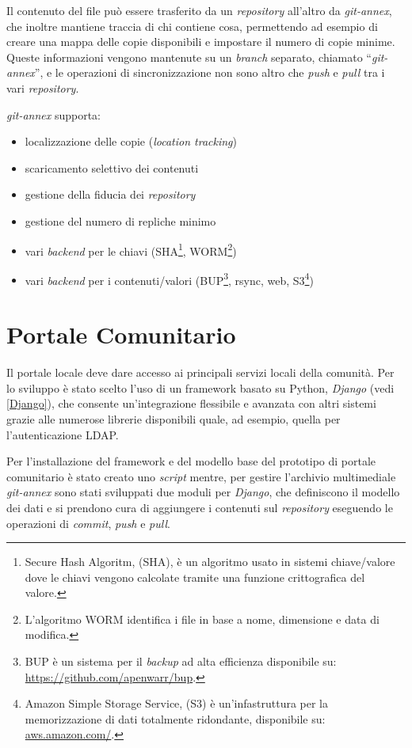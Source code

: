 Il contenuto del file può essere trasferito da un \emph{repository}
all'altro da \emph{git-annex}, che inoltre mantiene traccia di chi
contiene cosa, permettendo ad esempio di creare una mappa delle copie
disponibili e impostare il numero di copie minime. Queste informazioni
vengono mantenute su un \emph{branch} separato, chiamato
``\emph{git-annex}'', e le operazioni di sincronizzazione non sono
altro che \emph{push} e \emph{pull} tra i vari \emph{repository}.

\emph{git-annex} supporta:
\begin{itemize}
\item localizzazione delle copie (\emph{location tracking})
\item scaricamento selettivo dei contenuti
\item gestione della fiducia dei \emph{repository}
\item gestione del numero di repliche minimo 
\item vari \emph{backend} per le chiavi (SHA\footnote{Secure Hash
    Algoritm, (SHA), è un algoritmo usato in sistemi chiave/valore
    dove le chiavi vengono calcolate tramite una funzione
    crittografica del valore.}, WORM\footnote{L'algoritmo WORM
    identifica i file in base a nome, dimensione e data di modifica.})
\item vari \emph{backend} per i contenuti/valori (BUP\footnote{BUP è
    un sistema per il \emph{backup} ad alta efficienza disponibile su:
    \url{https://github.com/apenwarr/bup}.}, rsync, web,
  S3\footnote{Amazon Simple Storage Service, (S3) è un'infastruttura
    per la memorizzazione di dati totalmente ridondante, disponibile
    su: \url{aws.amazon.com/}.})
\end{itemize}

\section{Portale Comunitario}
Il portale locale deve dare accesso ai principali servizi locali della
comunità. Per lo sviluppo è stato scelto l'uso di un framework basato
su Python, \emph{Django} (vedi \ref{Django}), che consente
un'integrazione flessibile e avanzata con altri sistemi grazie alle
numerose librerie disponibili quale, ad esempio, quella per
l'autenticazione LDAP.

Per l'installazione del framework e del modello base del prototipo di
portale comunitario è stato creato uno \emph{script} mentre, per
gestire l'archivio multimediale \emph{git-annex} sono stati sviluppati
due moduli per \emph{Django}, che definiscono il modello dei dati e si
prendono cura di aggiungere i contenuti sul \emph{repository}
eseguendo le operazioni di \emph{commit}, \emph{push} e \emph{pull}.

